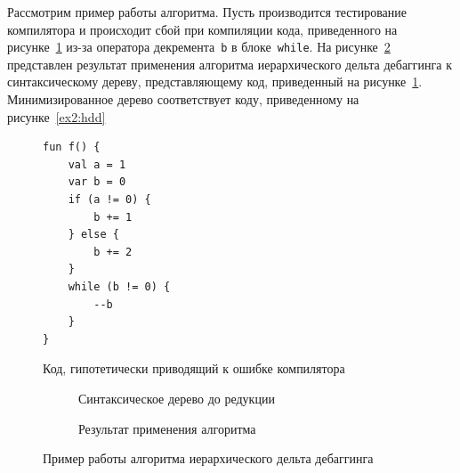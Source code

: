 
Рассмотрим пример работы алгоритма. Пусть производится тестирование компилятора и происходит сбой при компиляции кода, приведенного на рисунке~\ref{ex1:hdd} из-за оператора декремента~\texttt{b} в блоке~\texttt{while}. На рисунке~\ref{ex:hdd} представлен результат применения алгоритма иерархического дельта дебаггинга к синтаксическому дереву, представляющему код, приведенный на рисунке~\ref{ex1:hdd}. Минимизированное дерево соответствует коду, приведенному на рисунке~\ref{ex2:hdd}
%
\begin{figure}
\begin{lstlisting}
fun f() {
    val a = 1
    var b = 0
    if (a != 0) {
        b += 1
    } else {
        b += 2
    }
    while (b != 0) {
        --b
    }
}
\end{lstlisting}
\caption{\label{ex1:hdd}Код, гипотетически приводящий к ошибке компилятора}
\end{figure}

\begin{figure}[h]
\begin{subfigure}[t]{\linewidth}
\caption{Синтаксическое дерево до редукции}
\end{subfigure}
\begin{subfigure}[t]{\linewidth}
\caption{Результат применения алгоритма}
\end{subfigure}
\caption{Пример работы алгоритма иерархического дельта дебаггинга}
\label{ex:hdd}
\end{figure}

